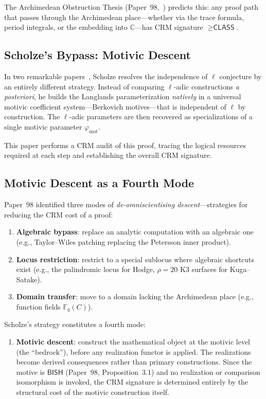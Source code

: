 \documentclass[11pt,a4paper]{article}
\theoremstyle{plain}
\theoremstyle{definition}
\newcommand{\BISH}{\textsf{BISH}}
\newcommand{\CLASS}{\textsf{CLASS}}
\newcommand{\C}{\mathbb{C}}
\newcommand{\F}{\mathbb{F}}
\begin{document}
The Archimedean Obstruction Thesis (Paper~98,~\cite{lee-p98}) predicts this: any proof path that passes through the Archimedean place---whether via the trace formula, period integrals, or the embedding into $\C$---has CRM signature $\geq \CLASS$.

\subsection{Scholze's Bypass: Motivic Descent}

In two remarkable papers~\cite{scholze-berkovich, scholze-motivic-geometrization}, Scholze resolves the independence of $\ell$ conjecture by an entirely different strategy. Instead of comparing $\ell$-adic constructions \emph{a posteriori}, he builds the Langlands parameterization \emph{natively} in a universal motivic coefficient system---Berkovich motives---that is independent of $\ell$ by construction. The $\ell$-adic parameters are then recovered as specializations of a single motivic parameter $\varphi_{\mathrm{mot}}$.

This paper performs a CRM audit of this proof, tracing the logical resources required at each step and establishing the overall CRM signature.

\subsection{Motivic Descent as a Fourth Mode}

Paper~98 identified three modes of \emph{de-omniscientising descent}---strategies for reducing the CRM cost of a proof:
\begin{enumerate}[label=(\roman*)]
\item \textbf{Algebraic bypass}: replace an analytic computation with an algebraic one (e.g., Taylor--Wiles patching replacing the Petersson inner product).
\item \textbf{Locus restriction}: restrict to a special sublocus where algebraic shortcuts exist (e.g., the palindromic locus for Hodge, $\rho=20$ K3 surfaces for Kuga--Satake).
\item \textbf{Domain transfer}: move to a domain lacking the Archimedean place (e.g., function fields $\F_q(C)$).
\end{enumerate}

Scholze's strategy constitutes a fourth mode:

\begin{enumerate}[label=(\roman*),resume]
\item \textbf{Motivic descent}: construct the mathematical object at the motivic level (the ``bedrock''), before any realization functor is applied. The realizations become derived consequences rather than primary constructions. Since the motive is $\BISH$ (Paper~98, Proposition~3.1) and no realization or comparison isomorphism is invoked, the CRM signature is determined entirely by the structural cost of the motivic construction itself.
\end{enumerate}
\end{document}
